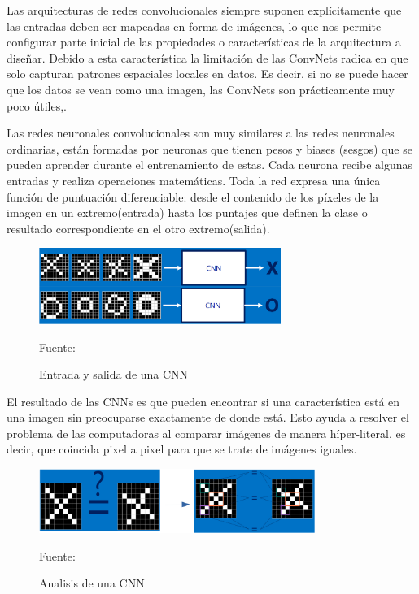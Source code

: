 	\vskip 0.4cm  
	Las arquitecturas de redes convolucionales siempre suponen explícitamente que las entradas deben ser mapeadas en forma de imágenes, lo que nos permite configurar parte inicial de las propiedades o características de la arquitectura a diseñar.  Debido a esta característica la limitación de las ConvNets radica en que solo capturan patrones espaciales locales en datos. Es decir, si no se puede hacer que los datos se vean como una imagen, las ConvNets son prácticamente muy poco útiles,\citep{Rohrer}.

	\vskip 0.4cm  
	Las redes neuronales convolucionales son muy similares a las redes neuronales ordinarias, están formadas por neuronas que tienen pesos y biases (sesgos) que se pueden aprender durante el entrenamiento de estas. Cada neurona recibe algunas entradas y realiza operaciones matemáticas. Toda la red expresa una única función de puntuación diferenciable: desde el contenido de los píxeles de la imagen en un extremo(entrada) hasta los puntajes que definen la clase o resultado correspondiente en el otro extremo(salida).

	\begin{figure}[H]
	\begin{center}
	\includegraphics[width=0.7\textwidth]{images/marcoteorico/entr_salida}
	\end{center}
	\begin{center}
	\caption{\small{Entrada y salida de una CNN}}
	\vskip -0.25cm
	{\small{Fuente: \cite{Rohrer}}}
	\end{center}
	\vspace{-1.5em}
	\end{figure}

	El resultado de las CNNs es que pueden encontrar si una característica está en una imagen sin preocuparse exactamente de donde está. Esto ayuda a resolver el problema de las computadoras al comparar imágenes de manera híper-literal, es decir, que coincida pixel a pixel para que se trate de imágenes iguales.

	\begin{figure}[H]
	\begin{center}
	\includegraphics[width=0.8\textwidth]{images/marcoteorico/literalcomp}
	\end{center}
	\begin{center}
	\caption{\small{Analisis de una CNN}}
	\vskip -0.25cm
	{\small{Fuente: \cite{Rohrer}}}
	\end{center}
	\vspace{-1.5em}
	\end{figure}

